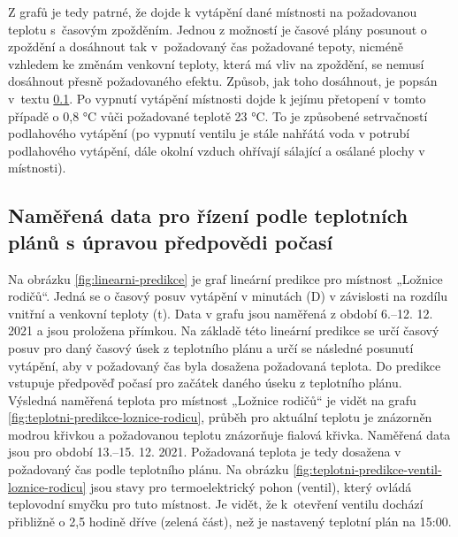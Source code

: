 Z grafů je tedy patrné, že dojde k vytápění dané místnosti na požadovanou teplotu s~časovým zpožděním. Jednou z možností je časové plány posunout o zpoždění a dosáhnout tak v~požadovaný čas požadované tepoty, nicméně vzhledem ke změnám venkovní teploty, která má vliv na zpoždění, se nemusí dosáhnout přesně požadovaného efektu. Způsob, jak toho dosáhnout, je popsán v~textu \ref{sec:namerena-data-pro-rizeni-podle-teplotnich-planu-s-upravou-predpovedi-pocasi}. Po vypnutí vytápění místnosti dojde k jejímu přetopení v tomto případě o 0,8 °C vůči požadované teplotě 23 °C. To je způsobené setrvačností podlahového vytápění (po vypnutí ventilu je stále nahřátá voda v potrubí podlahového vytápění, dále okolní vzduch ohřívají sálající a osálané plochy v místnosti).

\subsection{Naměřená data pro řízení podle teplotních plánů s úpravou předpovědi počasí}
\label{sec:namerena-data-pro-rizeni-podle-teplotnich-planu-s-upravou-predpovedi-pocasi}
Na obrázku \ref{fig:linearni-predikce} je graf lineární predikce pro místnost „Ložnice rodičů“. Jedná se o časový posuv vytápění v minutách (D) v závislosti na rozdílu vnitřní a venkovní teploty (t). Data v grafu jsou naměřená z období 6.–12. 12. 2021 a jsou proložena přímkou. Na základě této lineární predikce se určí časový posuv pro daný časový úsek z teplotního plánu a určí se následné posunutí vytápění, aby v požadovaný čas byla dosažena požadovaná teplota. Do predikce vstupuje předpověď počasí pro začátek daného úseku z teplotního plánu. Výsledná naměřená teplota pro místnost „Ložnice rodičů“ je vidět na grafu \ref{fig:teplotni-predikce-loznice-rodicu}, průběh pro aktuální teplotu je znázorněn modrou křivkou a požadovanou teplotu znázorňuje fialová křivka. Naměřená data jsou pro období 13.–15. 12. 2021. Požadovaná teplota je tedy dosažena v požadovaný čas podle teplotního plánu. Na obrázku \ref{fig:teplotni-predikce-ventil-loznice-rodicu} jsou stavy pro termoelektrický pohon (ventil), který ovládá teplovodní smyčku pro tuto místnost. Je vidět, že k~otevření ventilu dochází přibližně o 2,5 hodině dříve (zelená část), než je nastavený teplotní plán na 15:00.  

